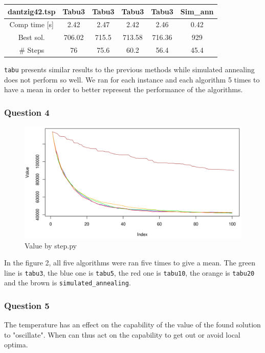 \documentclass[a4paper,10pt]{article}
\begin{document}
\begin{center}
\begin{tabular}{|c|c|c|c|c|c|}
\hline 
dantzig42.tsp & Tabu3 & Tabu3 & Tabu3 & Tabu3 & Sim\_ann\\ 
\hline 
Comp time [s] & 2.42 & 2.47 & 2.42 & 2.46 & 0.42 \\ 
\hline 
Best sol. & 706.02 & 715.5 & 713.58 & 716.36 & 929 \\ 
\hline 
\# Steps & 76 & 75.6 & 60.2 & 56.4 & 45.4 \\ 
\hline 
\end{tabular} 
\end{center}
\texttt{tabu} presents similar results to the previous methods while simulated annealing does not perform so well. We ran for each instance and each algorithm 5 times to have a mean in order to better represent the performance of the algorithms.
\subsubsection{Question 4}
\begin{center}
\begin{figure}[ht]
		\includegraphics[scale=.35]{tabu_sa.png}
	\caption{Value by step.py}
\end{figure}
\end{center}
In the figure 2, all five algorithms were ran five times to give a mean. The green line is \texttt{tabu3}, the blue one is \texttt{tabu5}, the red one is \texttt{tabu10}, the orange is \texttt{tabu20} and the brown is \texttt{simulated\_annealing}.
\subsubsection{Question 5}
The temperature has an effect on the capability of the value of the found solution to "oscillate". When can thus act on the capability to get out or avoid local optima.
\end{document}
